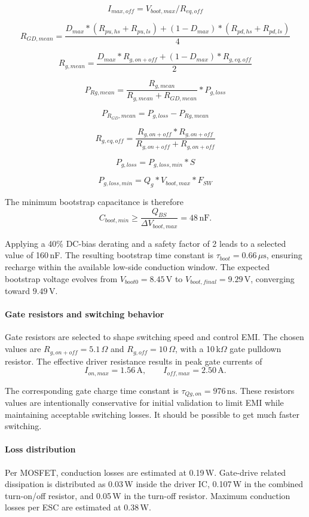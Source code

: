 \documentclass[a4paper, 10pt, conference]{IEEEtran} %
\begin{document}
\[
I_{max,off} = V_{boot,max} / R_{eq,off}
\]

\[
R_{GD,mean} = \frac{D_{max}*(R_{pu,hs}+R_{pu,ls}) +(1-D_{max})*(R_{pd,hs}+R_{pd,ls})}{4}
\]

\[
R_{g,mean} = \frac{D_{max}*R_{g,on+off} +(1-D_{max})*R_{g,eq,off}}{2}
\]

\[
P_{Rg,mean} = \frac{R_{g,mean}}{R_{g,mean}+R_{GD,mean}}*P_{g,loss}
\]

\[
P_{R_{GD},mean} = P_{g,loss}-P_{Rg,mean}
\]

\[
R_{g,eq,off} = \frac{   R_{g,on+off} * R_{g,on+off}   }{   R_{g,on+off} + R_{g,on+off}  }
\]

\[
P_{g,loss} = P_{g,loss,min}*S
\]

\[
P_{g,loss,min} = Q_g * V_{boot,max} * F_{SW}
\]

The minimum bootstrap capacitance is therefore
\[
C_{boot,min} \ge \frac{Q_{BS}}{\Delta V_{boot,max}} = 48\,\text{nF}.
\]

Applying a 40\% DC-bias derating and a safety factor of 2 leads to a selected value of 160\,nF. The resulting bootstrap time constant is $\tau_{boot} = 0.66\,\mu\text{s}$, ensuring recharge within the available low-side conduction window. The expected bootstrap voltage evolves from $V_{boot0}=8.45\,\text{V}$ to $V_{boot,final}=9.29\,\text{V}$, converging toward $9.49\,\text{V}$.

\paragraph{Gate resistors and switching behavior}

Gate resistors are selected to shape switching speed and control EMI. The chosen values are $R_{g,on+off}=5.1\,\Omega$ and $R_{g,off}=10\,\Omega$, with a 10\,k$\Omega$ gate pulldown resistor. The effective driver resistance results in peak gate currents of
\[
I_{on,max} = 1.56\,\text{A}, \qquad
I_{off,max} = 2.50\,\text{A}.
\]

The corresponding gate charge time constant is $\tau_{Qg,on}=976\,\text{ns}$. These resistors values are intentionally conservative for initial validation to limit EMI while maintaining acceptable switching losses. It should be possible to get much faster switching.

\paragraph{Loss distribution}

Per MOSFET, conduction losses are estimated at 0.19\,W. Gate-drive related dissipation is distributed as 0.03\,W inside the driver IC, 0.107\,W in the combined turn-on/off resistor, and 0.05\,W in the turn-off resistor. Maximum conduction losses per ESC are estimated at 0.38\,W.
\end{document}
